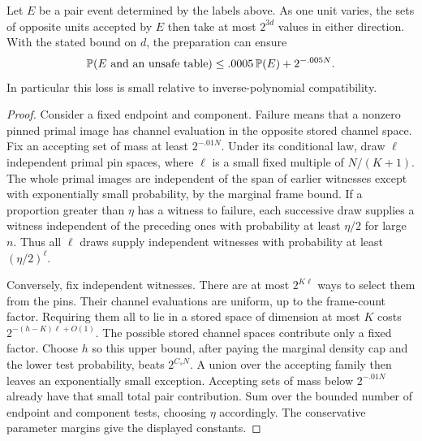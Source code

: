 \begin{lemma}\label{lem:injection}
Let \(E\) be a pair event determined by the labels above. As one unit
varies, the sets of opposite units accepted by \(E\) then take at most
\(2^{3d}\) values in either direction. With the stated bound on \(d\),
the preparation can ensure
\[
 \mathbb P(E\text{ and an unsafe table})
 \le .0005\,\mathbb P(E)+2^{-.005N}.
\]
In particular this loss is small relative to inverse-polynomial
compatibility.
\end{lemma}
\begin{proof}
Consider a fixed endpoint and component. Failure means that a nonzero
pinned primal image has channel evaluation in the opposite stored channel
space. Fix an accepting set of mass at least \(2^{-.01N}\).
Under its conditional law, draw \(\ell\) independent primal pin spaces,
where \(\ell\) is a small fixed multiple of \(N/(K+1)\).
The whole primal images are independent of the span of earlier witnesses
except with exponentially small probability, by the marginal frame bound.
If a proportion greater than \(\eta\) has a witness to failure,
each successive draw supplies a witness independent of the preceding
ones with probability at least \(\eta/2\) for large \(n\).
Thus all \(\ell\) draws supply independent witnesses with probability
at least \((\eta/2)^\ell\).

Conversely, fix independent witnesses. There are at most \(2^{K\ell}\)
ways to select them from the pins. Their channel evaluations are uniform,
up to the frame-count factor. Requiring them all to lie in a stored space
of dimension at most \(K\) costs \(2^{-(h-K)\ell+O(1)}\).
The possible stored channel spaces contribute only a fixed factor.
Choose \(h\) so this upper bound, after paying the marginal density cap
and the lower test probability, beats \(2^{C_sN}\).
A union over the accepting family then leaves an exponentially small
exception. Accepting sets of mass below \(2^{-.01N}\) already have that
small total pair contribution. Sum over the bounded number of endpoint
and component tests, choosing \(\eta\) accordingly. The conservative
parameter margins give the displayed constants.
\end{proof}
